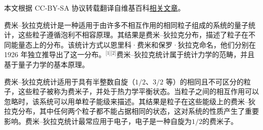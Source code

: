 
本文根据 CC-BY-SA 协议转载翻译自维基百科\href{https://en.wikipedia.org/wiki/Fermi\%E2\%80\%93Dirac_statistics}{相关文章}。

费米–狄拉克统计是一种适用于由许多不相互作用的相同粒子组成的系统的量子统计，这些粒子遵循泡利不相容原理。其结果是费米–狄拉克分布，描述了粒子在不同能量态上的分布。该统计方式以恩里科·费米和保罗·狄拉克命名，他们分别在 1926 年独立推导出了这一分布。\(^\text{[1][2]}\)费米–狄拉克统计属于统计力学的范畴，并且基于量子力学的基本原理。

费米–狄拉克统计适用于具有半整数自旋（\(1/2\)、\(3/2\) 等）的相同且不可区分的粒子，这些粒子被称为费米子，并处于热力学平衡状态。当粒子之间的相互作用可以忽略时，该系统可以用单粒子能级来描述。其结果是粒子在这些能级上的费米–狄拉克分布，其中任何两个粒子都不能占据相同的状态，这对系统的性质产生了重要影响。费米–狄拉克统计最常应用于电子，电子是一种自旋为\(1/2\)的费米子。